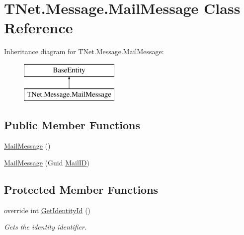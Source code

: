 \hypertarget{class_t_net_1_1_message_1_1_mail_message}{}\section{T\+Net.\+Message.\+Mail\+Message Class Reference}
\label{class_t_net_1_1_message_1_1_mail_message}


 


Inheritance diagram for T\+Net.\+Message.\+Mail\+Message\+:\begin{figure}[H]
\begin{center}
\leavevmode
\includegraphics[height=2.000000cm]{class_t_net_1_1_message_1_1_mail_message}
\end{center}
\end{figure}
\subsection*{Public Member Functions}
\begin{DoxyCompactItemize}
\item 
\mbox{\hyperlink{class_t_net_1_1_message_1_1_mail_message_a61bf251d51f3dba7e2fd14eda4bfbc5a}{Mail\+Message}} ()
\item 
\mbox{\hyperlink{class_t_net_1_1_message_1_1_mail_message_a1b9d705b01bbcb1bc324d8587d60fdeb}{Mail\+Message}} (Guid \mbox{\hyperlink{class_t_net_1_1_message_1_1_mail_message_a16d2c1be187ef6c354529f4ce11e5697}{Mail\+ID}})
\end{DoxyCompactItemize}
\subsection*{Protected Member Functions}
\begin{DoxyCompactItemize}
\item 
override int \mbox{\hyperlink{class_t_net_1_1_message_1_1_mail_message_a4ad9855acfbaf11e5e4ad0ced01ce0d7}{Get\+Identity\+Id}} ()
\begin{DoxyCompactList}\small\item\em Gets the identity identifier. \end{DoxyCompactList}\end{DoxyCompactItemize}
